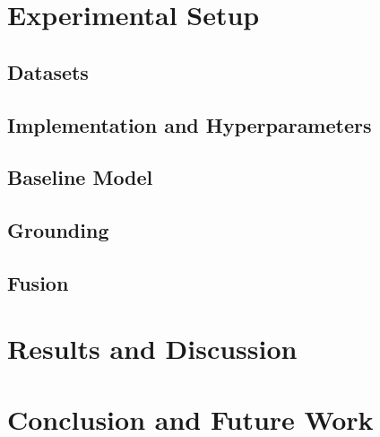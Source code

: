\documentclass{article}
\begin{document}
\section{Experimental Setup}

\subsection{Datasets} \label{datasets}

\subsection{Implementation and Hyperparameters}

\subsection{Baseline Model}

\subsection{Grounding}

\subsection{Fusion}

\section{Results and Discussion}
\section{Conclusion and Future Work}


\end{document}
